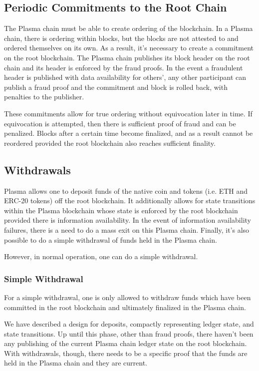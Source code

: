 \documentclass[letterpaper, 11pt]{article}
\begin{document}
\subsection{Periodic Commitments to the Root Chain}

The Plasma chain must be able to create ordering of the blockchain. In a Plasma
chain, there is ordering within blocks, but the blocks are not attested to and
ordered themselves on its own. As a result, it's necessary to create a
commitment on the root blockchain. The Plasma chain publishes its block header
on the root chain and its header is enforced by the fraud proofs. In the event a
fraudulent header is published with data availability for others', any other
participant can publish a fraud proof and the commitment and block is rolled
back, with penalties to the publisher.

These commitments allow for true ordering without equivocation later in time. If
equivocation is attempted, then there is sufficient proof of fraud and can be
penalized. Blocks after a certain time become finalized, and as a result cannot
be reordered provided the root blockchain also reaches sufficient finality.

\subsection{Withdrawals}

Plasma allows one to deposit funds of the native coin and tokens (i.e. ETH and
ERC-20 tokens) off the root blockchain. It additionally allows for state
transitions within the Plasma blockchain whose state is enforced by the root
blockchain provided there is information availability. In the event of
information availability failures, there is a need to do a mass exit on this
Plasma chain. Finally, it's also possible to do a simple withdrawal of funds
held in the Plasma chain.

However, in normal operation, one can do a simple withdrawal.

\subsubsection{Simple Withdrawal}

For a simple withdrawal, one is only allowed to withdraw funds which have been
committed in the root blockchain and ultimately finalized in the Plasma chain.

We have described a design for deposits, compactly representing ledger state,
and state transitions. Up until this phase, other than fraud proofs, there
haven't been any publishing of the current Plasma chain ledger state on the root
blockchain. With withdrawals, though, there needs to be a specific proof that
the funds are held in the Plasma chain and they are current.
\end{document}

